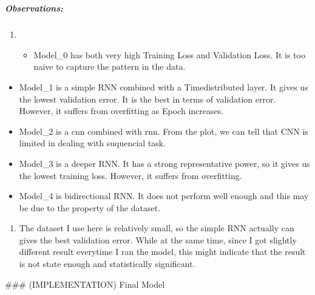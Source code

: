 \documentclass[11pt]{article}
\providecommand{\tightlist}{%
      \setlength{\itemsep}{0pt}\setlength{\parskip}{0pt}}
\begin{document}
    \begin{center}
    \end{center}
    { \hspace*{\fill} \\}
    
    \subparagraph{Observations:}\label{observations}

\begin{enumerate}
\def\labelenumi{\arabic{enumi}.}
\item
  \begin{itemize}
  \tightlist
  \item
    Model\_0 has both very high Training Loss and Validation Loss. It is
    too naive to capture the pattern in the data.
  \end{itemize}
\end{enumerate}

\begin{itemize}
\tightlist
\item
  Model\_1 is a simple RNN combined with a Timedistributed layer. It
  gives us the lowest validation error. It is the best in terms of
  validation error. However, it suffers from overfitting as Epoch
  increases.
\item
  Model\_2 is a cnn combined with rnn. From the plot, we can tell that
  CNN is limited in dealing with suquencial task.
\item
  Model\_3 is a deeper RNN. It has a strong representative power, so it
  gives us the lowest training loss. However, it suffers from
  overfitting.
\item
  Model\_4 is bidirectional RNN. It does not perform well enough and
  this may be due to the property of the dataset.
\end{itemize}

\begin{enumerate}
\def\labelenumi{\arabic{enumi}.}
\setcounter{enumi}{1}
\tightlist
\item
  The dataset I use here is relatively small, so the simple RNN actually
  can gives the best validation error. While at the same time, since I
  got slightly different result everytime I ran the model, this might
  indicate that the result is not state enough and statistically
  significant.
\end{enumerate}

     \#\#\# (IMPLEMENTATION) Final Model
\end{document}
